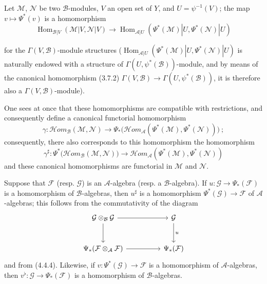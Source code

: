 \begin{env}[4.4.6]
\label{0.4.4.6}
Let $\mathcal{M}$, $\mathcal{N}$ be two $\mathcal{B}$-modules, $V$ an open set
of $Y$, and $U=\psi^{-1}(V)$; the map $v\mapsto\Psi^*(v)$ is a
homomorphism
\[
  \operatorname{Hom}_{\mathcal{B}|V}(\mathcal{M}|V,\mathcal{N}|V)
  \longrightarrow
  \operatorname{Hom}_{\mathcal{A}|U}
  (\Psi^*(\mathcal{M})|U,\Psi^*(\mathcal{N})|U)
\]
\begin{sloppypar}
for the $\Gamma(V,\mathcal{B})$-module structures
($\operatorname{Hom}_{\mathcal{A}|U}
(\Psi^*(\mathcal{M})|U,\allowbreak\Psi^*(\mathcal{N})|U)$ is naturally endowed with a
structure of $\Gamma(U,\psi^*(\mathcal{B}))$-module, and by means of the
canonical homomorphism
(3.7.2)
$\Gamma(V,\mathcal{B})\to\Gamma(U,\psi^*(\mathcal{B}))$, it is therefore also a
$\Gamma(V,\mathcal{B})$-module).
\end{sloppypar}
One sees at once that these homomorphisms are
compatible with restrictions, and consequently define a canonical
functorial homomorphism
\[
  \gamma:\mathcal{H}\!om_{\mathcal{B}}(\mathcal{M},\mathcal{N})
  \longrightarrow
  \Psi_*\bigl(\mathcal{H}\!om_{\mathcal{A}}
  (\Psi^*(\mathcal{M}),\Psi^*(\mathcal{N}))\bigr)~;
\]
consequently, there also corresponds to this homomorphism the homomorphism
\[
  \gamma^\sharp:
  \Psi^*\bigl(\mathcal{H}\!om_{\mathcal{B}}(\mathcal{M},\mathcal{N})\bigr)
  \longrightarrow
  \mathcal{H}\!om_{\mathcal{A}}
  (\Psi^*(\mathcal{M}),\Psi^*(\mathcal{N}))
\]
and these canonical homomorphisms are functorial in $\mathcal{M}$ and
$\mathcal{N}$.
\end{env}

\begin{env}[4.4.7]
\label{0.4.4.7}
Suppose that $\mathcal{F}$ (resp. $\mathcal{G}$) is an
$\mathcal{A}$-algebra (resp. a $\mathcal{B}$-algebra). If
$u:\mathcal{G}\to\Psi_*(\mathcal{F})$ is a homomorphism of
$\mathcal{B}$-algebras, then $u^\sharp$ is a homomorphism
$\Psi^*(\mathcal{G})\to\mathcal{F}$ of $\mathcal{A}$-algebras; this follows
from the commutativity of the diagram
\[
\begin{tikzcd}[column sep=huge,row sep=large]
\mathcal{G}\otimes_{\mathcal{B}}\mathcal{G}
  \arrow[r] \arrow[d]
  & \mathcal{G} \arrow[d,"u"] \\
\Psi_*(\mathcal{F}\otimes_{\mathcal{A}}\mathcal{F})
  \arrow[r]
  & \Psi_*(\mathcal{F})
\end{tikzcd}
\]
and from (4.4.4). Likewise, if $v:\Psi^*(\mathcal{G})\to\mathcal{F}$ is a
homomorphism of $\mathcal{A}$-algebras, then
$v^\flat:\mathcal{G}\to\Psi_*(\mathcal{F})$ is a homomorphism of
$\mathcal{B}$-algebras.
\end{env}

